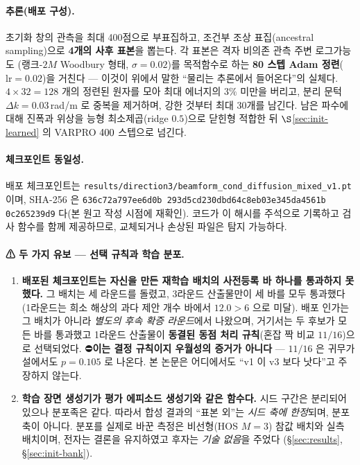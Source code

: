 \documentclass[11pt]{report}
\numberwithin{equation}{chapter}
\numberwithin{figure}{chapter}
\numberwithin{table}{chapter}
\begin{document}
\paragraph{추론(배포 구성).}
초기화 창의 관측을 최대 400점으로 부표집하고, 조건부 조상 표집(ancestral sampling)으로
\textbf{4개의 사후 표본}을 뽑는다. 각 표본은 격자 비의존 관측 주변 로그가능도
(랭크-$2M$ Woodbury 형태, $\sigma = 0.02$)를 목적함수로 하는
\textbf{80 스텝 Adam 정련}($\text{lr} = 0.02$)을 거친다 --- 이것이 위에서 말한
``물리는 추론에서 들어온다''의 실체다.
$4 \times 32 = 128$ 개의 정련된 원자를 모아 최대 에너지의 $3\%$ 미만을 버리고,
분리 문턱 $\Delta k = 0.03$\,rad/m 로 중복을 제거하며, 강한 것부터 최대 30개를 남긴다.
남은 파수에 대해 진폭과 위상을 능형 최소제곱(ridge $0.5$)으로 닫힌형 적합한 뒤
$\S$\ref{sec:init-learned} 의 VARPRO $400$ 스텝으로 넘긴다.

\paragraph{체크포인트 동일성.}
배포 체크포인트는
\texttt{results/direction3/beamform\_cond\_diffusion\_mixed\_v1.pt} 이며,
SHA-256 은 \texttt{636c72a7\allowbreak 97ee6d0b\allowbreak
293d5cd2\allowbreak 30dbd64c\allowbreak 8eb03e34\allowbreak 5da4561b\allowbreak
0c265239\allowbreak d9} 다(본 원고 작성 시점에 재확인).
코드가 이 해시를 주석으로 기록하고 검사 함수를 함께 제공하므로, 교체되거나 손상된
파일은 탐지 가능하다.

\paragraph{⚠ 두 가지 유보 --- 선택 규칙과 학습 분포.}
\begin{enumerate}
  \item \textbf{배포된 체크포인트는 자신을 만든 재학습 배치의 사전등록 바 하나를 통과하지
        못했다.} 그 배치는 세 라운드를 돌렸고, 3라운드 산출물만이 세 바를 모두 통과했다
        (1라운드는 희소 해상의 과다 제안 개수 바에서 $12.0 > 6$ 으로 미달).
        배포 인가는 그 배치가 아니라 \emph{별도의 후속 확증 라운드}에서 나왔으며,
        거기서는 두 후보가 모든 바를 통과했고 1라운드 산출물이
        \textbf{동결된 동점 처리 규칙}(혼잡 짝 비교 $11/16$)으로 선택되었다.
        ⛔\textbf{이는 결정 규칙이지 우월성의 증거가 아니다} --- $11/16$ 은 귀무가설에서도
        $p = 0.105$ 로 나온다. 본 논문은 어디에서도 ``v1 이 v3 보다 낫다''고 주장하지 않는다.
  \item \textbf{학습 장면 생성기가 평가 에피소드 생성기와 같은 함수다.}
        시드 구간은 분리되어 있으나 분포족은 같다. 따라서 합성 결과의
        ``표본 외''는 \emph{시드 축에 한정}되며, 분포 축이 아니다.
        분포를 실제로 바꾼 측정은 비선형(HOS $M{=}3$) 참값 배치와 실측 배치이며,
        전자는 결론을 유지하였고 후자는 \emph{기술 없음}을 주었다
        (§\ref{sec:results}, §\ref{sec:init-bank}).
\end{enumerate}
\end{document}
